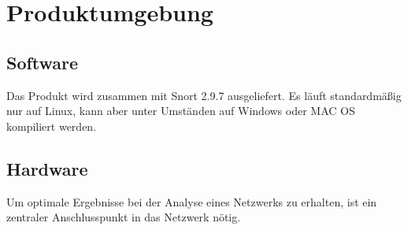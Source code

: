 \chapter{Produktumgebung}

\section{Software}
Das Produkt wird zusammen mit Snort 2.9.7 ausgeliefert. Es läuft standardmäßig nur auf Linux, kann aber unter Umständen auf Windows oder MAC OS kompiliert werden.

\section{Hardware}
Um optimale Ergebnisse bei der Analyse eines Netzwerks zu erhalten, ist ein zentraler Anschlusspunkt in das Netzwerk nötig.